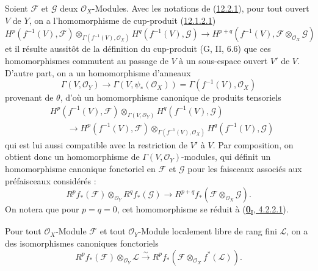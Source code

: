 \begin{env}[12.2.2]
\label{0.12.2.2-fr}
Soient $\mathcal F$ et $\mathcal G$ deux $\mathcal O_X$-Modules. Avec les
notations de (\hyperref[0.12.2.1-fr]{12.2.1}), pour tout ouvert $V$ de $Y$,
on a l'homomorphisme de cup-produit
(\hyperref[0.12.1.2.1-fr]{12.1.2.1})
\[
H^p(f^{-1}(V),\mathcal F)
\otimes_{\Gamma(f^{-1}(V),\mathcal O_X)}
H^q(f^{-1}(V),\mathcal G)
\longrightarrow
H^{p+q}(f^{-1}(V),\mathcal F\otimes_{\mathcal O_X}\mathcal G)
\]
et il résulte aussitôt de la définition du cup-produit (G, II, 6.6) que ces
homomorphismes commutent au passage de $V$ à un sous-espace ouvert $V'$ de
$V$. D'autre part, on a un homomorphisme d'anneaux
\[
\Gamma(V,\mathcal O_Y)\longrightarrow\Gamma(V,\psi_*(\mathcal O_X))
=\Gamma(f^{-1}(V),\mathcal O_X)
\]
provenant de $\theta$, d'où un homomorphisme canonique de produits tensoriels
\[
\begin{aligned}
&H^p(f^{-1}(V),\mathcal F)\otimes_{\Gamma(V,\mathcal O_Y)}
H^q(f^{-1}(V),\mathcal G)\\
&\qquad\longrightarrow
H^p(f^{-1}(V),\mathcal F)
\otimes_{\Gamma(f^{-1}(V),\mathcal O_X)}
H^q(f^{-1}(V),\mathcal G)
\end{aligned}
\]
qui est lui aussi compatible avec la restriction de $V'$ à $V$. Par
composition, on obtient donc un homomorphisme de
$\Gamma(V,\mathcal O_Y)$-modules, qui définit un homomorphisme canonique
fonctoriel en $\mathcal F$ et $\mathcal G$ pour les faisceaux associés aux
préfaisceaux considérés :
\[
\label{0.12.2.2.1-fr}
\tag{12.2.2.1}
R^p f_*(\mathcal F)\otimes_{\mathcal O_Y}R^q f_*(\mathcal G)
\longrightarrow
R^{p+q}f_*(\mathcal F\otimes_{\mathcal O_X}\mathcal G).
\]
On notera que pour $p=q=0$, cet homomorphisme se réduit à
(\hyperref[0.4.2.2.1-fr]{\textbf{0}\textsubscript{I}, 4.2.2.1}).
\end{env}

\begin{proposition}[12.2.3]
\label{0.12.2.3-fr}
Pour tout $\mathcal O_X$-Module $\mathcal F$ et tout
$\mathcal O_Y$-Module localement libre de rang fini $\mathcal L$, on a des
isomorphismes canoniques fonctoriels
\[
\label{0.12.2.3.1-fr}
\tag{12.2.3.1}
R^p f_*(\mathcal F)\otimes_{\mathcal O_Y}\mathcal L
\xrightarrow{\sim}
R^p f_*(\mathcal F\otimes_{\mathcal O_X}f^*(\mathcal L)).
\]
\end{proposition}


